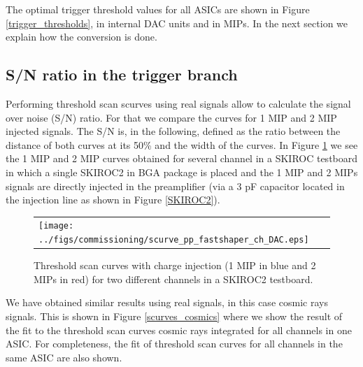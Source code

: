 \documentclass[a4paper,11pt]{article}
\begin{document}
The optimal trigger threshold values for all ASICs are shown in Figure \ref{trigger_thresholds}, in internal DAC units and in MIPs. In the next section we explain how the conversion is done.

\subsection{S/N ratio in the trigger branch}
\label{sec:comm_trigger_sn}

Performing threshold scan scurves using
real signals allow to calculate the signal over noise (S/N) ratio.
For that we compare the curves for 1 MIP and 2 MIP injected signals.
The S/N is, in the following, defined as the ratio between the distance of both curves at its
50\% and the width of the curves.
In Figure \ref{scurves_injection} we see the 1 MIP and 2 MIP curves obtained for several channel
in a SKIROC testboard in which a single SKIROC2 in BGA package is placed and the 1 MIP and 2 MIPs 
 signals are directly injected in the preamplifier 
(via a 3 pF capacitor located in the injection line as shown in Figure \ref{SKIROC2}). 


\begin{figure}[!t]
    \centering
  \begin{tabular}{l}
	\texttt{[image: ../figs/commissioning/scurve\_pp\_fastshaper\_ch\_DAC.eps]} \\
	\end{tabular}
\caption{Threshold scan curves with charge injection (1 MIP in blue and 2 MIPs in red) for two different channels in a SKIROC2 testboard.}
\label{scurves_injection}
\end{figure}


We have obtained similar results using real signals, in this case cosmic rays signals. This is shown 
in Figure \ref{scurves_cosmics}  where 
we show the result of the fit to the threshold scan curves cosmic rays integrated for all channels
in one ASIC. For completeness, the fit of threshold scan curves for all channels
in the same ASIC are also shown.
\end{document}

